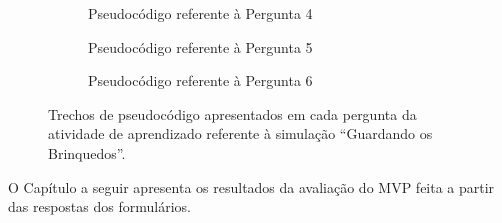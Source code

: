 \begin{figure}[h!]
\begin{subfigure}[t]{0.5\textwidth}
        \caption{Pseudocódigo referente à Pergunta 4}
        \label{figure:atividade_brinquedos_4}
    \end{subfigure}
    \par\bigskip %
    \begin{subfigure}[t]{0.5\textwidth}
        \centering
        \setlength{\fboxrule}{0.1pt} %
        \caption{Pseudocódigo referente à Pergunta 5}
        \label{figure:atividade_brinquedos_5}
    \end{subfigure}
    \par\bigskip %
    \begin{subfigure}[t]{0.5\textwidth}
        \centering
        \setlength{\fboxrule}{0.1pt} %
        \caption{Pseudocódigo referente à Pergunta 6}
        \label{figure:atividade_brinquedos_6}
    \end{subfigure}
    \caption{Trechos de pseudocódigo apresentados em cada pergunta da atividade de aprendizado referente à simulação \enquote{Guardando os Brinquedos}.}
    \label{figure:atividade_brinquedos}
\end{figure}

O Capítulo a seguir apresenta os resultados da avaliação do MVP feita a partir das respostas dos formulários.
